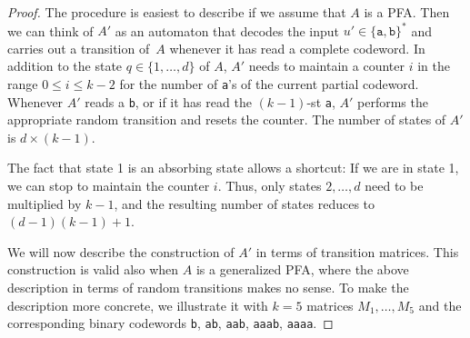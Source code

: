 \documentclass[a4paper,cleveref, autoref, thm-restate]{lipics-v2021}
\begin{document}
\begin{proof}
  The procedure is easiest to describe if we assume that $A$ is a PFA.
  Then we can think of $A'$ as an automaton that decodes the input
 $u'\in\{\mathtt{a},\mathtt{b}\}^*$ and carries out a transition of~$A$ whenever it has
  read a complete codeword.  In addition to the state
  $q\in\{1,\ldots,d\}$ of $A$, $A'$ needs to maintain a counter $i$ in
  the range $0\le i \le k-2$ for the number of \texttt{a}'s of the
  current partial codeword.  Whenever $A'$ reads a \texttt{b}, or if it has read the
  $(k-1)$-st \texttt{a}, $A'$ performs the appropriate random
  transition and resets the counter.  The number of states of $A'$ is
  $d\times(k-1)$.
    
  The fact that state 1 is an absorbing state allows a shortcut:
  If we are in state 1, we can stop to maintain the counter $i$.
  Thus, only states $2,\ldots,d$ need to be multiplied by $k-1$, and
  the resulting number of states reduces to $(d-1)(k-1)+1$.

  We will now describe the construction of $A'$ in terms of transition
  matrices.
  This construction is valid also when $A$ is a generalized PFA, where
  the above description in terms of random transitions makes no sense. 
  To make the description more concrete, we illustrate it with
  $k=5$ matrices $M_1,\ldots,M_5$
and the corresponding binary  codewords
\texttt{b}, \texttt{ab}, \texttt{aab}, \texttt{aaab}, \texttt{aaaa}.


\end{proof}
\end{document}
